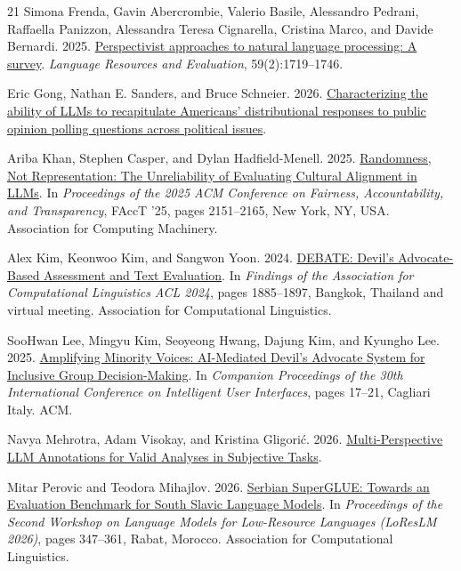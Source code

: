\documentclass[11pt,a4paper]{article}
\begin{document}
\begin{thebibliography}{21}
Simona Frenda, Gavin Abercrombie, Valerio Basile, Alessandro Pedrani, Raffaella Panizzon, Alessandra Teresa Cignarella, Cristina Marco, and Davide Bernardi. 2025. \href{https://doi.org/10.1007/s10579-024-09766-4}{Perspectivist approaches to natural language processing: A survey}. \emph{Language Resources and Evaluation}, 59(2):1719--1746.

Eric Gong, Nathan E. Sanders, and Bruce Schneier. 2026. \href{https://doi.org/10.48550/ARXIV.2603.20229}{Characterizing the ability of LLMs to recapitulate Americans' distributional responses to public opinion polling questions across political issues}.

Ariba Khan, Stephen Casper, and Dylan Hadfield-Menell. 2025. \href{https://doi.org/10.1145/3715275.3732147}{Randomness, Not Representation: The Unreliability of Evaluating Cultural Alignment in LLMs}. In \emph{Proceedings of the 2025 ACM Conference on Fairness, Accountability, and Transparency}, FAccT '25, pages 2151--2165, New York, NY, USA. Association for Computing Machinery.

Alex Kim, Keonwoo Kim, and Sangwon Yoon. 2024. \href{https://doi.org/10.18653/v1/2024.findings-acl.112}{DEBATE: Devil's Advocate-Based Assessment and Text Evaluation}. In \emph{Findings of the Association for Computational Linguistics ACL 2024}, pages 1885--1897, Bangkok, Thailand and virtual meeting. Association for Computational Linguistics.

SooHwan Lee, Mingyu Kim, Seoyeong Hwang, Dajung Kim, and Kyungho Lee. 2025. \href{https://doi.org/10.1145/3708557.3716334}{Amplifying Minority Voices: AI-Mediated Devil's Advocate System for Inclusive Group Decision-Making}. In \emph{Companion Proceedings of the 30th International Conference on Intelligent User Interfaces}, pages 17--21, Cagliari Italy. ACM.

Navya Mehrotra, Adam Visokay, and Kristina Gligori\'{c}. 2026. \href{https://doi.org/10.48550/ARXIV.2603.21404}{Multi-Perspective LLM Annotations for Valid Analyses in Subjective Tasks}.

Mitar Perovic and Teodora Mihajlov. 2026. \href{https://doi.org/10.18653/v1/2026.loreslm-1.30}{Serbian SuperGLUE: Towards an Evaluation Benchmark for South Slavic Language Models}. In \emph{Proceedings of the Second Workshop on Language Models for Low-Resource Languages (LoResLM 2026)}, pages 347--361, Rabat, Morocco. Association for Computational Linguistics.


\end{thebibliography}
\end{document}
